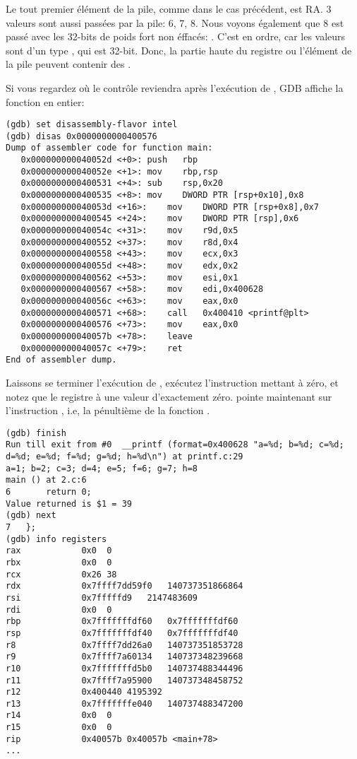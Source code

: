Le tout premier élément de la pile, comme dans le cas précédent, est \ac{RA}.
3 valeurs sont aussi passées par la pile: 6, 7, 8.
Nous voyons également que 8 est passé avec les 32-bits de poids fort non
éffacés: .
C'est en ordre, car les valeurs sont d'un type \Tint, qui est 32-bit.
Donc, la partie haute du registre ou l'élément de la pile peuvent contenir des
.

Si vous regardez où le contrôle reviendra après l'exécution de \printf,
\ac{GDB} affiche la fonction \main en entier:

\begin{lstlisting}[style=customasmx86]
(gdb) set disassembly-flavor intel
(gdb) disas 0x0000000000400576
Dump of assembler code for function main:
   0x000000000040052d <+0>:	push   rbp
   0x000000000040052e <+1>:	mov    rbp,rsp
   0x0000000000400531 <+4>:	sub    rsp,0x20
   0x0000000000400535 <+8>:	mov    DWORD PTR [rsp+0x10],0x8
   0x000000000040053d <+16>:	mov    DWORD PTR [rsp+0x8],0x7
   0x0000000000400545 <+24>:	mov    DWORD PTR [rsp],0x6
   0x000000000040054c <+31>:	mov    r9d,0x5
   0x0000000000400552 <+37>:	mov    r8d,0x4
   0x0000000000400558 <+43>:	mov    ecx,0x3
   0x000000000040055d <+48>:	mov    edx,0x2
   0x0000000000400562 <+53>:	mov    esi,0x1
   0x0000000000400567 <+58>:	mov    edi,0x400628
   0x000000000040056c <+63>:	mov    eax,0x0
   0x0000000000400571 <+68>:	call   0x400410 <printf@plt>
   0x0000000000400576 <+73>:	mov    eax,0x0
   0x000000000040057b <+78>:	leave  
   0x000000000040057c <+79>:	ret    
End of assembler dump.
\end{lstlisting}

Laissons se terminer l'exécution de \printf, exécutez l'instruction mettant \EAX
à zéro, et notez que le registre \EAX à une valeur d'exactement zéro.
\RIP pointe maintenant sur l'instruction , i.e, la pénultième de la
fonction \main.

\begin{lstlisting}
(gdb) finish
Run till exit from #0  __printf (format=0x400628 "a=%d; b=%d; c=%d; d=%d; e=%d; f=%d; g=%d; h=%d\n") at printf.c:29
a=1; b=2; c=3; d=4; e=5; f=6; g=7; h=8
main () at 2.c:6
6		return 0;
Value returned is $1 = 39
(gdb) next
7	};
(gdb) info registers
rax            0x0	0
rbx            0x0	0
rcx            0x26	38
rdx            0x7ffff7dd59f0	140737351866864
rsi            0x7fffffd9	2147483609
rdi            0x0	0
rbp            0x7fffffffdf60	0x7fffffffdf60
rsp            0x7fffffffdf40	0x7fffffffdf40
r8             0x7ffff7dd26a0	140737351853728
r9             0x7ffff7a60134	140737348239668
r10            0x7fffffffd5b0	140737488344496
r11            0x7ffff7a95900	140737348458752
r12            0x400440	4195392
r13            0x7fffffffe040	140737488347200
r14            0x0	0
r15            0x0	0
rip            0x40057b	0x40057b <main+78>
...
\end{lstlisting}
